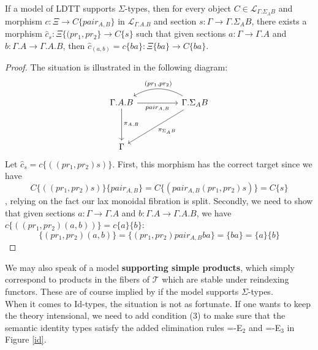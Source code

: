 \begin{thm}
If a model of LDTT supports $\Sigma$-types, then for every object $C \in \mathcal{L}_{\Gamma.\Sigma_AB}$ and morphism $c : \Xi \to C\{pair_{A,B}\}$ in $\mathcal{L}_{\Gamma.A.B}$ and section $s : \Gamma \to \Gamma.\Sigma_AB$, there exists a morphism $\hat c_s : \Xi\{(pr_1, pr_2\} \to C\{s\}$ such that given sections $a : \Gamma \to \Gamma.A$ and $b : \Gamma.A \to \Gamma.A.B$, then $\hat c_{(a, b)} = c\{ba\} : \Xi\{ba\} \to C\{ba\}$.
\begin{proof}
  The situation is illustrated in the following diagram:
    \[
      \ti
      \Gamma.A.B \ar[d, "\pi_{A,B}"] \ar[r,"pair_{A,B}",swap] & \Gamma.\Sigma_AB \ar[l,"{(pr_1, pr_2)}",bend right,swap] \ar[dl, "\pi_{\Sigma_AB}"]\\
      \Gamma &
      \kz
    \]
Let $\hat c_s = c\{((pr_1, pr_2)s)\}$. First, this morphism has the correct target since we have
    \[
      C\{((pr_1,pr_2)s)\}\{pair_{A,B}\} = C\{(pair_{A,B}(pr_1,pr_2)s)\} = C\{s\}
    \]
    , relying on the fact our lax monoidal fibration is split. Secondly, we need to show that given sections $a : \Gamma \to \Gamma.A$ and $b : \Gamma.A \to \Gamma.A.B$, we have $c\{((pr_1,pr_2)(a, b))\} = c\{a\}\{b\}$:
    \[
      \{(pr_1,pr_2)(a, b)\} = \{(pr_1,pr_2)pair_{A,B}ba\} = \{ba\} = \{a\}\{b\}
    \]
  \end{proof}
\end{thm}
We may also speak of a model \textbf{supporting simple products}, which simply correspond to products in the fibers of $\mathcal{T}$ which are stable under reindexing functors. These are of course implied by if the model supports $\Sigma$-types.\\
When it comes to Id-types, the situation is not as fortunate. If one wants to keep the theory intensional, we need to add condition (3) to make sure that the semantic identity types satisfy the added elimination rules =-E$_2$ and =-E$_3$ in Figure \ref{id}.
